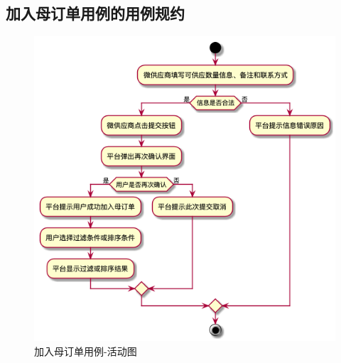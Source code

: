 \subsection{加入母订单用例的用例规约}
\begin{figure}[htp]
    \centering
    \includegraphics[width=14cm]{figure/usecase_v2/join.png}
    \caption{加入母订单用例-活动图}
    \label{fig:uc_order_commit}
\end{figure}


